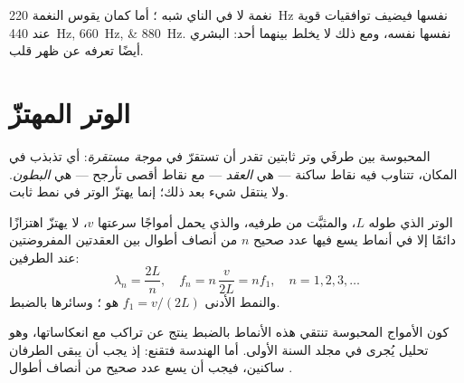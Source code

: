 \begin{example}\label{ex:g12:sound-acoustics:two-instruments}
نغمة لا في الناي شبه ؛ أما كمان يقوس النغمة
\qty{220}{Hz} نفسها فيضيف توافقيات قوية عند \qtylist{440;660;880}{Hz}.
 نفسها  نفسه، ومع ذلك لا يخلط بينهما أحد:  البشري أيضًا
 تعرفه عن ظهر قلب.
\end{example}

\section{الوتر المهتزّ}

\begin{definition}\label{def:g12:sound-acoustics:standing-wave}
 المحبوسة بين طرفَي وتر ثابتين تقدر أن تستقرّ في
\emph{موجة مستقرة}: أي تذبذب في المكان،
تتناوب فيه نقاط ساكنة --- هي \emph{العقد} --- مع
نقاط أقصى تأرجح --- هي \emph{البطون}.
ولا ينتقل شيء بعد ذلك؛ إنما يهتزّ الوتر في نمط ثابت.
\end{definition}

\begin{proposition}\label{prop:g12:sound-acoustics:string-modes}
الوتر الذي طوله $L$، والمثبَّت من طرفيه، والذي يحمل أمواجًا سرعتها
$v$، لا يهتزّ اهتزازًا دائمًا إلا في أنماط يسع فيها عدد صحيح $n$
من أنصاف أطوال  بين العقدتين المفروضتين عند الطرفين:
\[ \lambda_n = \frac{2L}{n}, \quad f_n = n\,\frac{v}{2L} = n f_1, \quad n = 1, 2, 3, \dots \]
والنمط الأدنى $f_1 = v/(2L)$ هو ؛ وسائرها
 بالضبط. \admitted
\end{proposition}

\begin{remark}\label{rem:g12:sound-acoustics:honest}
كون الأمواج المحبوسة تنتقي هذه الأنماط بالضبط ينتج عن
تراكب  مع انعكاساتها، وهو تحليل يُجرى في
مجلد السنة الأولى. أما الهندسة فتقنع: إذ يجب أن يبقى الطرفان
ساكنين، فيجب أن يسع عدد صحيح من أنصاف أطوال .
\end{remark}

